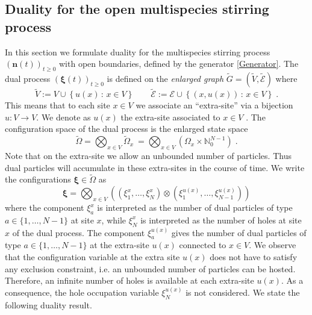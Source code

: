 \documentclass[10pt]{article}
\numberwithin{equation}{section}
\numberwithin{equation}{subsection}
\newcommand{\dt}{\;.}
\begin{document}
\subsection{Duality for the open multispecies stirring process}\label{statementDualitySubsection}
In this section we formulate duality for the multispecies stirring process $(\bm{n}(t))_{t\geq 0}$ with open boundaries, defined by the generator \eqref{Generator}.
The dual  process $(\bm{\xi}(t))_{t\geq 0}$ is defined on the \textit{enlarged graph} $\widetilde{G}=(\widetilde{V},\widetilde{\mathcal{E}})$ where 
\begin{equation}
	\widetilde{V}:=V\cup \left\{u(x)\,:\, x\in V\right\}\qquad \widetilde{\mathcal{E}}:=\mathcal{E}\cup \left\{(x,u(x))\,:\, x\in V\right\}\dt
\end{equation}
This means that to each site $x\in V$ we associate an ``extra-site'' via a bijection $u:V\to V$. We denote as $u(x)$ the extra-site associated to $x\in V$ . The configuration space of the dual process is the enlarged state space
\begin{equation}\label{dualStateSpace}
    \widetilde{\Omega}= \bigotimes_{x\in V} \widetilde{\Omega}_{x}\ = \bigotimes_{x\in V} (\Omega_{x}\times \mathbb{N}_{0}^{N-1})\dt
\end{equation}
Note that on the extra-site we allow an unbounded number of particles. Thus
dual particles will accumulate in these extra-sites in the course of time. 
We write the configurations $\bm{\xi} \in \widetilde\Omega$  as
\begin{equation}\label{row-dual-vectors}
    \bm{\xi}=\bigotimes_{x\in V} \left(\left(\xi_{1}^{x},\ldots,\xi_{N}^{x}\right)\otimes (\xi_{1}^{u(x)},\ldots,\xi_{N-1}^{u(x)} )\right) 
\end{equation} 
where the component $\xi_{a}^{x}$ is interpreted as the number of dual particles of type $a\in \{1,\ldots,N-1\}$ at site $x$, {\color{blue} while $\xi_{N}^{x}$ is interpreted as the number of holes at site $x$ of the dual process.}
The component $\xi_{a}^{u(x)}$  gives the number of dual particles of type $a\in \{1,\ldots,N-1\}$ at 
the extra-site $u(x)$ connected to $x\in V$. {\color{blue} We observe that the configuration variable at the extra site $u(x)$ does not have to satisfy any exclusion constraint, i.e. an unbounded number of particles can be hosted. Therefore, an infinite number of holes is available at each extra-site $u(x)$. As a consequence, the hole occupation variable $\xi_{N}^{u(x)}$ is not considered}. We state the following duality result.
\end{document}
